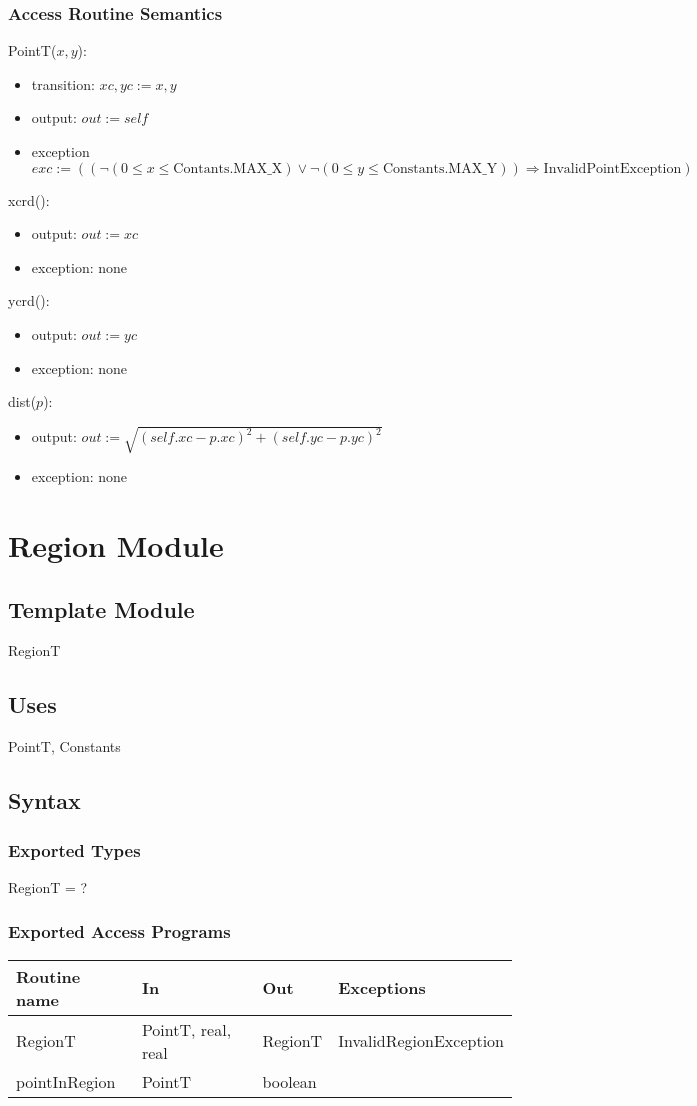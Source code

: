 \documentclass[12pt]{article}
\begin{document}
\subsubsection* {Access Routine Semantics}
PointT($x, y$):
\begin{itemize}
\item transition: $xc, yc := x, y$
\item output: $out := \mathit{self}$
\item exception
 $exc := ((\neg(0 \leq x \leq \mbox{Contants.MAX\_X}) \vee \neg(0 \leq y \leq \mbox{Constants.MAX\_Y})) \Rightarrow
\mbox{InvalidPointException})$
\end{itemize}
\noindent xcrd():
\begin{itemize}
\item output: $out := xc$
\item exception: none
\end{itemize}
\noindent ycrd():
\begin{itemize}
\item output: $out := yc$
\item exception: none
\end{itemize}
\noindent dist($p$):
\begin{itemize}
\item output: $out := \sqrt{(\mathit{self}.xc - p.xc)^2 + (\mathit{self}.yc - p.yc)^2}$
\item exception: none
\end{itemize}
\newpage


\section* {Region Module}
\subsection* {Template Module}
RegionT
\subsection* {Uses}
PointT, Constants
\subsection* {Syntax}
\subsubsection* {Exported Types}
RegionT = ?
\subsubsection* {Exported Access Programs}
\begin{tabular}{| l | l | l | l |}
\hline
\textbf{Routine name} & \textbf{In} & \textbf{Out} & \textbf{Exceptions}\\
\hline
RegionT & PointT, real, real & RegionT & InvalidRegionException\\
\hline
pointInRegion & PointT & boolean & ~\\
\hline 
\end{tabular}
\end{document}
